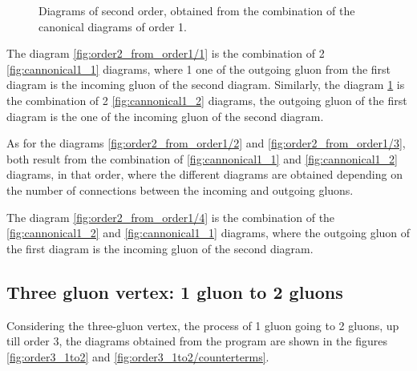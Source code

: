 \documentclass[11pt,a4paper,twoside,pdf]{article}
\numberwithin{equation}{section}
\begin{document}
\begin{figure}[h!]
\begin{subfigure}[t]{0.19\textwidth}
        \caption{ }
        \label{fig:order2_from_order1/5}
    \end{subfigure}
    \caption{Diagrams of second order, obtained from the combination of the canonical
diagrams of order 1.}
    \label{fig:order2_from_order1}
\end{figure}

The diagram \ref{fig:order2_from_order1/1} is the combination of 2 
\ref{fig:cannonical1_1} diagrams, where 1 one of the outgoing gluon from the first
diagram is the incoming gluon of the second diagram. Similarly, the diagram
\ref{fig:order2_from_order1/5} is the combination of 2 \ref{fig:cannonical1_2} diagrams, 
the outgoing gluon of the first diagram is the one of the incoming gluon of the 
second diagram.

As for the diagrams \ref{fig:order2_from_order1/2} and \ref{fig:order2_from_order1/3}, 
both result from the combination of \ref{fig:cannonical1_1} and \ref{fig:cannonical1_2} diagrams,
in that order, where the different diagrams are obtained depending on the number of
connections between the incoming and outgoing gluons.

The diagram \ref{fig:order2_from_order1/4} is the combination of the
\ref{fig:cannonical1_2} and \ref{fig:cannonical1_1} diagrams, where the outgoing gluon
of the first diagram is the incoming gluon of the second diagram.

\subsection{Three gluon vertex: 1 gluon to 2 gluons}

Considering the three-gluon vertex, the process of 1 gluon going to 2 gluons, up till 
order 3, the diagrams obtained from the program are shown in the figures 
\ref{fig:order3_1to2} and \ref{fig:order3_1to2/counterterms}.
\end{document}
